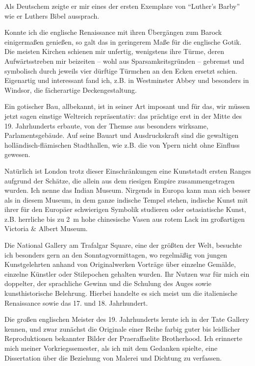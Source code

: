 \documentclass[a5paper,pagesize,10pt,twoside=true]{scrbook}
\renewcommand{\marginpar}[2][]{}
\begin{document}
Als Deutschem zeigte er mir eines der ersten Exemplare von \enquote{Luther's Barby} wie er Luthers Bibel aussprach.

Konnte ich die englische Renaissance mit ihren Übergängen zum Barock einigermaßen genießen, so galt das in geringerem Maße für die englische Gotik. Die meisten Kirchen schienen mir unfertig, wenigstens ihre Türme, deren Aufwärtsstreben mir beizeiten -- wohl aus Sparsamkeitsgründen -- gebremst und symbolisch durch jeweils vier dürftige Türmchen an den Ecken ersetzt schien. Eigenartig und interessant fand ich, z.B. in Westminster Abbey und besonders in Windsor, die fächerartige Deckengestaltung.

Ein gotischer Bau, allbekannt, ist in seiner Art imposant und für das, wir müssen jetzt sagen einstige Weltreich repräsentativ: das prächtige erst in der Mitte des 19. Jahrhunderts erbaute, von der Themse aus besonders wirksame, Parlamentsgebäude. Auf seine Bauart und Ausdruckskraft sind die gewaltigen holländisch-flämischen Stadthallen, wie z.B. die von Ypern nicht ohne Einfluss gewesen.

Natürlich ist London trotz dieser Einschränkungen eine Kunststadt ersten Ranges aufgrund der Schätze, die allein aus dem riesigen Empire zusammengetragen wurden. Ich nenne das Indian Museum. Nirgends in Europa kann man sich besser als in diesem Museum, in dem ganze indische Tempel stehen, indische Kunst mit ihrer für den Europäer schwierigen Symbolik studieren oder ostasiatische Kunst, z.B. herrliche bis zu 2~m hohe chinesische Vasen aus rotem Lack im großartigen Victoria \& Albert Museum.

\marginpar{498}
Die National Gallery am Trafalgar Square, eine der größten der Welt, besuchte ich besonders gern an den Sonntagvormittagen, wo regelmäßig von jungen Kunstgelehrten anhand von Originalwerken Vorträge über einzelne Gemälde, einzelne Künstler oder Stilepochen gehalten wurden. Ihr Nutzen war für mich ein doppelter, der sprachliche Gewinn und die Schulung des Auges sowie kunsthistorische Belehrung. Hierbei handelte es sich meist um die italienische Renaissance sowie das 17. und 18. Jahrhundert.

Die großen englischen Meister des 19. Jahrhunderts lernte ich in der Tate Gallery kennen, und zwar zunächst die Originale einer Reihe farbig guter bis leidlicher Reproduktionen bekannter Bilder der Praeraffaelite Brotherhood. Ich erinnerte mich meiner Vorkriegssemester, als ich mit dem Gedanken spielte, eine Dissertation über die Beziehung von Malerei und Dichtung zu verfassen.
\end{document}
